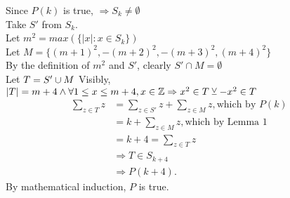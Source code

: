 \documentclass[fleqn]{article}
\begin{document}
Since $P(k)$ is true, $\Rightarrow S_{k} \not= \emptyset$\\
Take $S'$ from $S_{k}$.\\
Let $m^2 = max(\lbrace |x| : x \in S_{k} \rbrace)$\\
Let $M = \lbrace (m+1)^2, -(m+2)^2, -(m+3)^2, (m+4)^2 \rbrace$\\
By the definition of $m^2$ and $S'$, clearly $S' \cap M = \emptyset$\\
Let $T = S' \cup M \\$
Visibly, $|T| = m+4 \wedge 
         \forall 1 \leq x \leq m+4, x \in \mathbb{Z} \Rightarrow
                                    x^2 \in T \veebar -x^2 \in T\\$
\begin{align*}
  \displaystyle\sum\limits_{z \in T} z 
  &=\displaystyle\sum\limits_{z \in S'} z + \displaystyle\sum\limits_{z \in M} z, \text{which by $P(k)$ }\\
  &=k + \displaystyle\sum\limits_{z \in M} z,\text{which by Lemma 1 }\\
  &=k + 4 = \displaystyle\sum\limits_{z \in T} z \\
  &\Rightarrow T \in S_{k+4}\\
  &\Rightarrow P(k+4).
\end{align*}
By mathematical induction, $P$ is true.
\end{document}
